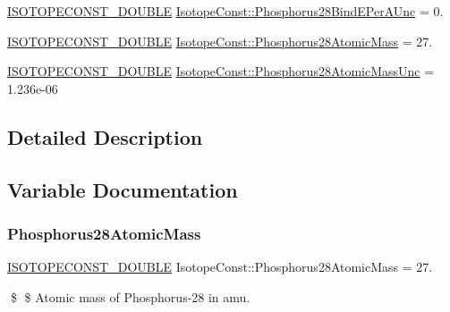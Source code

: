 \begin{DoxyCompactItemize}
\mbox{\hyperlink{group___isotope_const-_macros_ga8f45a7272ce02c0b4c65c44636ed719a}{I\+S\+O\+T\+O\+P\+E\+C\+O\+N\+S\+T\+\_\+\+D\+O\+U\+B\+LE}} \mbox{\hyperlink{group___isotope_const-_phosphorus-_p28_ga784ced2512e8c373f0346a7c1dbbbbe7}{Isotope\+Const\+::\+Phosphorus28\+Bind\+E\+Per\+A\+Unc}} = 0.
\item 
\mbox{\hyperlink{group___isotope_const-_macros_ga8f45a7272ce02c0b4c65c44636ed719a}{I\+S\+O\+T\+O\+P\+E\+C\+O\+N\+S\+T\+\_\+\+D\+O\+U\+B\+LE}} \mbox{\hyperlink{group___isotope_const-_phosphorus-_p28_ga762cb414c4c1a642c968070fa38c32ce}{Isotope\+Const\+::\+Phosphorus28\+Atomic\+Mass}} = 27.
\item 
\mbox{\hyperlink{group___isotope_const-_macros_ga8f45a7272ce02c0b4c65c44636ed719a}{I\+S\+O\+T\+O\+P\+E\+C\+O\+N\+S\+T\+\_\+\+D\+O\+U\+B\+LE}} \mbox{\hyperlink{group___isotope_const-_phosphorus-_p28_ga5fda95447f397034d88a02259fce4cab}{Isotope\+Const\+::\+Phosphorus28\+Atomic\+Mass\+Unc}} = 1.\+236e-\/06
\end{DoxyCompactItemize}


\subsection{Detailed Description}


\subsection{Variable Documentation}
\mbox{\label{group___isotope_const-_phosphorus-_p28_ga762cb414c4c1a642c968070fa38c32ce}} 
\subsubsection{\texorpdfstring{Phosphorus28\+Atomic\+Mass}{Phosphorus28AtomicMass}}
{\footnotesize\ttfamily \mbox{\hyperlink{group___isotope_const-_macros_ga8f45a7272ce02c0b4c65c44636ed719a}{I\+S\+O\+T\+O\+P\+E\+C\+O\+N\+S\+T\+\_\+\+D\+O\+U\+B\+LE}} Isotope\+Const\+::\+Phosphorus28\+Atomic\+Mass = 27.}

\$ \$ Atomic mass of Phosphorus-\/28 in amu. \mbox{\label{group___isotope_const-_phosphorus-_p28_ga5fda95447f397034d88a02259fce4cab}} 
